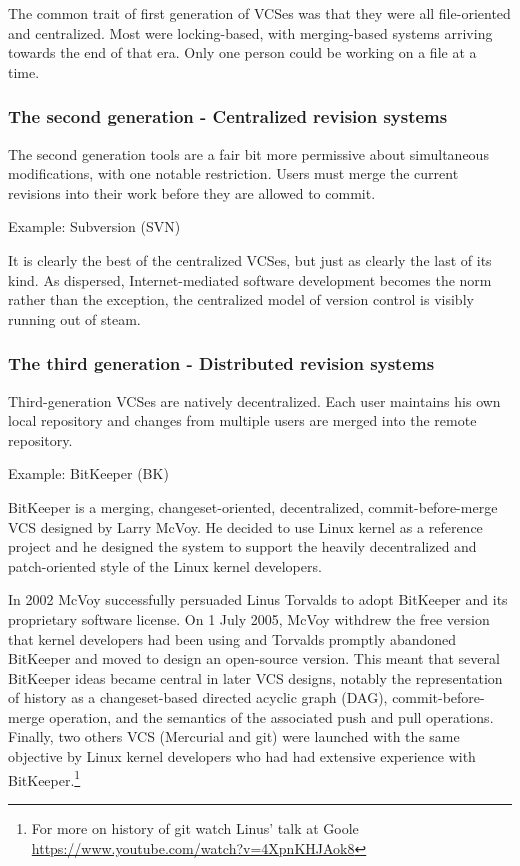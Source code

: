 \documentclass{article}
\begin{document}
The common trait of first generation of VCSes was that they were all
file-oriented and centralized. Most were locking-based, with
merging-based systems arriving towards the end of that era. Only one
person could be working on a file at a time. 

\subsubsection*{The second generation - Centralized revision systems}

The second generation tools are a fair bit more permissive about
simultaneous modifications, with one notable restriction. Users must
merge the current revisions into their work before they are allowed to
commit. 

Example: Subversion (SVN)

It is clearly the best of the centralized VCSes, but just as clearly
the last of its kind. As dispersed, Internet-mediated software
development becomes the norm rather than the exception, the
centralized model of version control is visibly running out of steam.

\subsubsection*{The third generation - Distributed revision systems}

Third-generation VCSes are natively decentralized. Each user maintains
his own local repository and changes from multiple users are merged 
into the remote repository.

Example: BitKeeper (BK)

BitKeeper is a merging, changeset-oriented, decentralized,
commit-before-merge VCS designed by Larry McVoy.
He decided to use Linux kernel as a reference project and he designed
the system to support the heavily decentralized and patch-oriented
style of the Linux kernel developers.

In 2002 McVoy successfully persuaded Linus Torvalds to adopt BitKeeper
and its proprietary software license. On 1 July 2005,
McVoy withdrew the free version that kernel developers had
been using and Torvalds promptly abandoned BitKeeper and moved
to design an open-source version. This meant that several BitKeeper
ideas became central in later VCS designs, notably the
representation of history as a changeset-based directed acyclic graph (DAG),
commit-before-merge operation, and the semantics of the associated
push and pull operations.
Finally, two others VCS (Mercurial and git) were launched with
the same objective by Linux kernel developers who had had extensive
experience with BitKeeper.\footnote{For more on history of git watch
  Linus' talk at Goole \url{https://www.youtube.com/watch?v=4XpnKHJAok8}}
\end{document}
